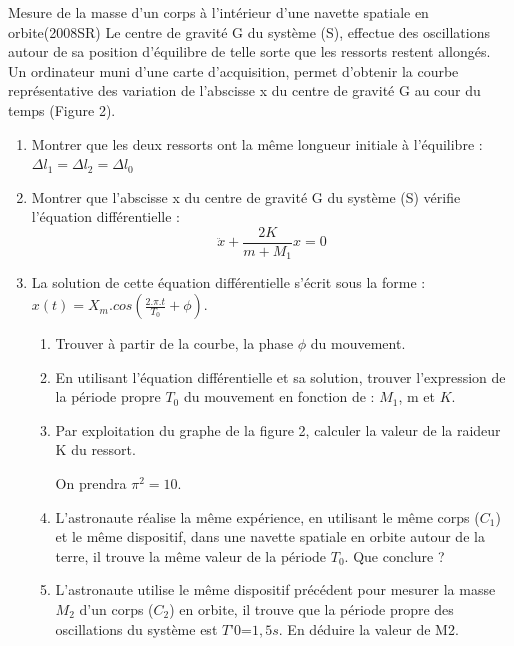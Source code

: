 \documentclass[12pt]{article}
\begin{document}
\begin{Box2}{Mesure de la masse d’un corps à l’intérieur d’une navette spatiale en
  orbite(2008SR) }
Le centre de gravité G du système (S), effectue des oscillations autour de sa position
d’équilibre de telle sorte que les ressorts restent allongés.
Un ordinateur muni d’une carte d’acquisition, permet d’obtenir la courbe
représentative des variation de l’abscisse x du centre de gravité G au cour du temps
(Figure 2).
\begin{enumerate}
  \item Montrer que les deux ressorts ont la même longueur initiale à l’équilibre : $\Delta{l_1}  = \Delta{l_2} = \Delta{l_0}$
  \item Montrer que l’abscisse x du centre de gravité G du système (S) vérifie
    l’équation différentielle : $$\ddot{x} + \frac{2K}{m + M_1}x = 0$$
  \item La solution de cette équation
    différentielle s’écrit sous la forme : $x(t) = X_m.cos(\frac{2.\pi.t}{T_0} + \phi)$.
    \begin{enumerate}
      \item Trouver à partir de la courbe,
la phase $\phi$ du mouvement.
\item En utilisant l’équation
différentielle et sa solution,
trouver l’expression de la
période propre $T_0$ du
mouvement en fonction de :
$M_1$, m et $K$.
\item Par exploitation du graphe de la figure 2, calculer la valeur de la raideur K
du ressort.


On prendra $\pi^2= 10$.
\item L’astronaute réalise la même expérience, en utilisant le même corps ($C_1$)
et le même dispositif, dans une navette spatiale en orbite autour de la
terre, il trouve la même valeur de la période $T_0$. Que conclure ?
\item L’astronaute utilise le même dispositif précédent pour mesurer la masse
$M_2$ d’un corps ($C_2$) en orbite, il trouve que la période propre des
oscillations du système est $T’0$=$1,5s$. En déduire la valeur de M2.
    \end{enumerate}
    
\end{enumerate}

\end{Box2}
\end{document}
